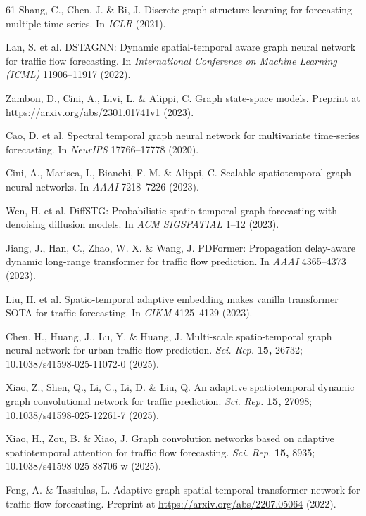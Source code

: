 \documentclass[fleqn,10pt]{wlscirep}
\begin{document}
\begin{thebibliography}{61}
Shang, C., Chen, J. \& Bi, J. Discrete graph structure learning for
  forecasting multiple time series. In \textit{ICLR} (2021).

Lan, S. et al. DSTAGNN: Dynamic spatial-temporal aware graph neural
  network for traffic flow forecasting. In \textit{International Conference
  on Machine Learning (ICML)} 11906--11917 (2022).

Zambon, D., Cini, A., Livi, L. \& Alippi, C. Graph state-space models.
  Preprint at \url{https://arxiv.org/abs/2301.01741v1} (2023).

Cao, D. et al. Spectral temporal graph neural network for multivariate
  time-series forecasting. In \textit{NeurIPS} 17766--17778 (2020).

Cini, A., Marisca, I., Bianchi, F. M. \& Alippi, C. Scalable
  spatiotemporal graph neural networks. In \textit{AAAI} 7218--7226 (2023).

Wen, H. et al. DiffSTG: Probabilistic spatio-temporal graph forecasting
  with denoising diffusion models. In \textit{ACM SIGSPATIAL} 1--12 (2023).

Jiang, J., Han, C., Zhao, W. X. \& Wang, J. PDFormer: Propagation
  delay-aware dynamic long-range transformer for traffic flow prediction.
  In \textit{AAAI} 4365--4373 (2023).

Liu, H. et al. Spatio-temporal adaptive embedding makes vanilla
  transformer SOTA for traffic forecasting. In \textit{CIKM} 4125--4129
  (2023).

Chen, H., Huang, J., Lu, Y. \& Huang, J. Multi-scale spatio-temporal graph
  neural network for urban traffic flow prediction. \textit{Sci. Rep.}
  \textbf{15,} 26732; 10.1038/s41598-025-11072-0 (2025).

Xiao, Z., Shen, Q., Li, C., Li, D. \& Liu, Q. An adaptive spatiotemporal
  dynamic graph convolutional network for traffic prediction.
  \textit{Sci. Rep.} \textbf{15,} 27098; 10.1038/s41598-025-12261-7 (2025).

Xiao, H., Zou, B. \& Xiao, J. Graph convolution networks based on adaptive
  spatiotemporal attention for traffic flow forecasting. \textit{Sci. Rep.}
  \textbf{15,} 8935; 10.1038/s41598-025-88706-w (2025).

Feng, A. \& Tassiulas, L. Adaptive graph spatial-temporal transformer
  network for traffic flow forecasting. Preprint at
  \url{https://arxiv.org/abs/2207.05064} (2022).


\end{thebibliography}
\end{document}
